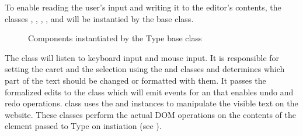 To enable reading the user's input and writing it to the editor's contents, the classes , , , ,  and  will be instantied by the  base class.


\begin{figure}[!htb]
\centering
{}
\caption{Components instantiated by the Type base class}
\label{fig:type_base_components}
\end{figure}


\noindent The  class will listen to keyboard input and mouse input. It is responsible for setting the caret and the selection using the  and  classes and determines which part of the text should be changed or formatted with them. It passes the formalized edits to the  class which will emit events for an  that enables undo and redo operations.  class uses the  and  instances to manipulate the visible text on the website. These classes perform the actual DOM operations on the contents of the element passed to Type on instiation (see ).

